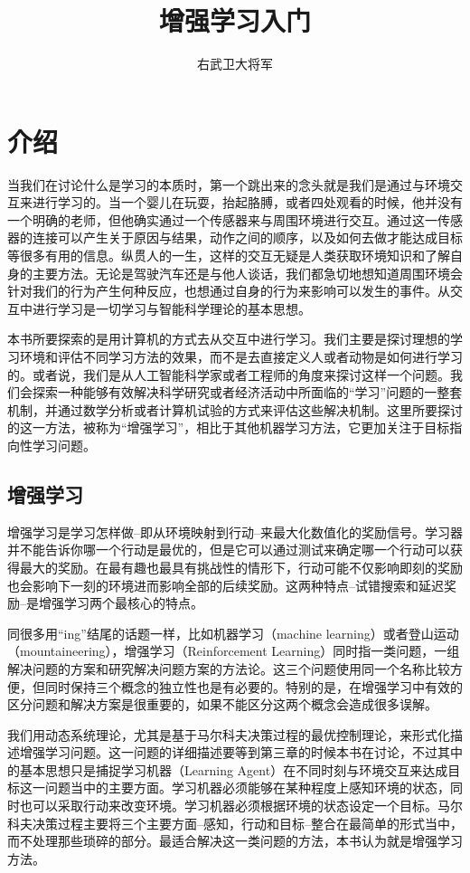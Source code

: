 \documentclass{ctexart}
\author{右武卫大将军}
\title{增强学习入门}
\begin{document}
    \maketitle
    \section{介绍}
        当我们在讨论什么是学习的本质时，第一个跳出来的念头就是我们是通过与环境交互来进行学习的。当一个婴儿在玩耍，抬起胳膊，或者四处观看的时候，他并没有一个明确的老师，但他确实通过一个传感器来与周围环境进行交互。通过这一传感器的连接可以产生关于原因与结果，动作之间的顺序，以及如何去做才能达成目标等很多有用的信息。纵贯人的一生，这样的交互无疑是人类获取环境知识和了解自身的主要方法。无论是驾驶汽车还是与他人谈话，我们都急切地想知道周围环境会针对我们的行为产生何种反应，也想通过自身的行为来影响可以发生的事件。从交互中进行学习是一切学习与智能科学理论的基本思想。

        本书所要探索的是用计算机的方式去从交互中进行学习。我们主要是探讨理想的学习环境和评估不同学习方法的效果，而不是去直接定义人或者动物是如何进行学习的。或者说，我们是从人工智能科学家或者工程师的角度来探讨这样一个问题。我们会探索一种能够有效解决科学研究或者经济活动中所面临的“学习”问题的一整套机制，并通过数学分析或者计算机试验的方式来评估这些解决机制。这里所要探讨的这一方法，被称为“增强学习”，相比于其他机器学习方法，它更加关注于目标指向性学习问题。
        \subsection{增强学习}
            增强学习是学习怎样做--即从环境映射到行动--来最大化数值化的奖励信号。学习器并不能告诉你哪一个行动是最优的，但是它可以通过测试来确定哪一个行动可以获得最大的奖励。在最有趣也最具有挑战性的情形下，行动可能不仅影响即刻的奖励也会影响下一刻的环境进而影响全部的后续奖励。这两种特点--试错搜索和延迟奖励--是增强学习两个最核心的特点。

            同很多用“ing”结尾的话题一样，比如机器学习（machine learning）或者登山运动（mountaineering），增强学习（Reinforcement Learning）同时指一类问题，一组解决问题的方案和研究解决问题方案的方法论。这三个问题使用同一个名称比较方便，但同时保持三个概念的独立性也是有必要的。特别的是，在增强学习中有效的区分问题和解决方案是很重要的，如果不能区分这两个概念会造成很多误解。

            我们用动态系统理论，尤其是基于马尔科夫决策过程的最优控制理论，来形式化描述增强学习问题。这一问题的详细描述要等到第三章的时候本书在讨论，不过其中的基本思想只是捕捉学习机器（Learning Agent）在不同时刻与环境交互来达成目标这一问题当中的主要方面。学习机器必须能够在某种程度上感知环境的状态，同时也可以采取行动来改变环境。学习机器必须根据环境的状态设定一个目标。马尔科夫决策过程主要将三个主要方面--感知，行动和目标--整合在最简单的形式当中，而不处理那些琐碎的部分。最适合解决这一类问题的方法，本书认为就是增强学习方法。
\end{document}
